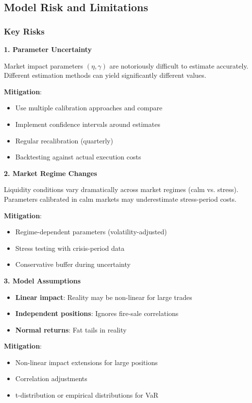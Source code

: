 \documentclass[11pt,a4paper]{article}
\begin{document}
\subsection{Model Risk and Limitations}

\subsubsection{Key Risks}

\textbf{1. Parameter Uncertainty}

Market impact parameters $(\eta, \gamma)$ are notoriously difficult to estimate accurately. Different estimation methods can yield significantly different values.

\textbf{Mitigation}:
\begin{itemize}
    \item Use multiple calibration approaches and compare
    \item Implement confidence intervals around estimates
    \item Regular recalibration (quarterly)
    \item Backtesting against actual execution costs
\end{itemize}

\textbf{2. Market Regime Changes}

Liquidity conditions vary dramatically across market regimes (calm vs. stress). Parameters calibrated in calm markets may underestimate stress-period costs.

\textbf{Mitigation}:
\begin{itemize}
    \item Regime-dependent parameters (volatility-adjusted)
    \item Stress testing with crisis-period data
    \item Conservative buffer during uncertainty
\end{itemize}

\textbf{3. Model Assumptions}

\begin{itemize}
    \item \textbf{Linear impact}: Reality may be non-linear for large trades
    \item \textbf{Independent positions}: Ignores fire-sale correlations
    \item \textbf{Normal returns}: Fat tails in reality
\end{itemize}

\textbf{Mitigation}:
\begin{itemize}
    \item Non-linear impact extensions for large positions
    \item Correlation adjustments
    \item t-distribution or empirical distributions for VaR
\end{itemize}
\end{document}
